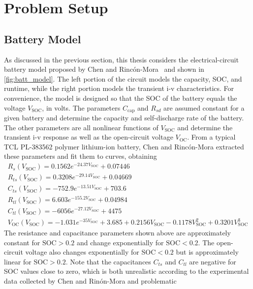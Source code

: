 \documentclass[../zhang_thesis.tex]{subfiles}
\begin{document}
\chapter{Problem Setup}


\section{Battery Model}
\label{sec:batt_mdl}

As discussed in the previous section, this thesis considers the electrical-circuit battery model proposed by Chen and Rinc\'on-Mora~\cite{chen06} and shown in \cref{fig:batt_model}. The left portion of the circuit models the capacity, SOC, and runtime, while the right portion models the transient i-v characteristics.  For convenience, the model is designed so that the SOC of the battery equals the voltage $V_\text{SOC}$, in volts. The parameters $C_\text{cap}$ and
$R_{sd}$ are assumed constant for a given battery and determine the capacity and self-discharge rate of the battery. The other parameters are all nonlinear functions of $V_\text{SOC}$ and determine the transient i-v response as well as the open-circuit voltage $V_\text{OC}$. From a typical TCL PL-383562 polymer lithium-ion battery, Chen and Rinc\'on-Mora extracted these parameters and fit them to curves, obtaining
\begin{gather}
    R_s(V_\text{SOC}) = 0.1562 e^{-24.37 V_\text{SOC}} + 0.07446 \label{eq:nl_param_1} \\
    R_{ts}(V_\text{SOC}) = 0.3208 e^{-29.14 V_\text{SOC}} + 0.04669 \\
    C_{ts}(V_\text{SOC}) = -752.9 e^{-13.51 V_\text{SOC}} + 703.6 \\
    R_{tl}(V_\text{SOC}) = 6.603 e^{-155.2 V_\text{SOC}} + 0.04984 \\
    C_{tl}(V_\text{SOC}) = -6056 e^{-27.12 V_\text{SOC}} + 4475 \\
    V_\text{OC}(V_\text{SOC}) = -1.031 e^{-35 V_\text{SOC}} + 3.685 + 0.2156 V_\text{SOC} - 0.1178 V_\text{SOC}^2 + 0.3201 V_\text{SOC}^3 \label{eq:nl_param_6}
\end{gather}
The resistance and capacitance parameters shown above are approximately constant for $\text{SOC}>0.2$ and change exponentially for $\text{SOC}<0.2$. The open-circuit voltage also changes exponentially for $\text{SOC}<0.2$ but is approximately linear for $\text{SOC}>0.2$. Note that the capacitances $C_{ts}$ and $C_{tl}$ are negative for SOC values close to zero, which is both unrealistic according to the experimental data collected by Chen and Rin\'on-Mora and problematic
\end{document}
